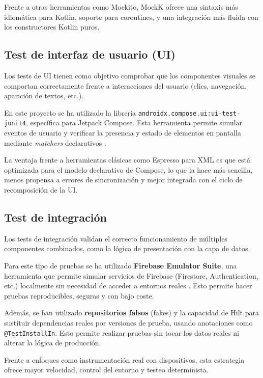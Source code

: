Frente a otras herramientas como Mockito, MockK ofrece una sintaxis más idiomática para Kotlin, soporte para coroutines, y una integración más fluida con los constructores Kotlin puros.

\subsection{Test de interfaz de usuario (UI)}

Los tests de UI tienen como objetivo comprobar que los componentes visuales se comportan correctamente frente a interacciones del usuario (clics, navegación, aparición de textos, etc.).

En este proyecto se ha utilizado la librería \texttt{androidx.compose.ui:ui-test-junit4}, específica para Jetpack Compose. Esta herramienta permite simular eventos de usuario y verificar la presencia y estado de elementos en pantalla mediante \textit{matchers} declarativos \cite{android-testing}.

La ventaja frente a herramientas clásicas como Espresso para XML es que está optimizada para el modelo declarativo de Compose, lo que la hace más sencilla, menos propensa a errores de sincronización y mejor integrada con el ciclo de recomposición de la UI.

\subsection{Test de integración}

Los tests de integración validan el correcto funcionamiento de múltiples componentes combinados, como la lógica de presentación con la capa de datos.

Para este tipo de pruebas se ha utilizado \textbf{Firebase Emulator Suite}, una herramienta que permite simular servicios de Firebase (Firestore, Authentication, etc.) localmente sin necesidad de acceder a entornos reales \cite{firebase-emulator}. Esto permite hacer pruebas reproducibles, seguras y con bajo coste.

Además, se han utilizado \textbf{repositorios falsos} (fakes) y la capacidad de Hilt para sustituir dependencias reales por versiones de prueba, usando anotaciones como \texttt{@TestInstallIn}. Esto permite realizar pruebas sin tocar los datos reales ni alterar la lógica de producción.

Frente a enfoques como instrumentación real con dispositivos, esta estrategia ofrece mayor velocidad, control del entorno y testeo determinista.

